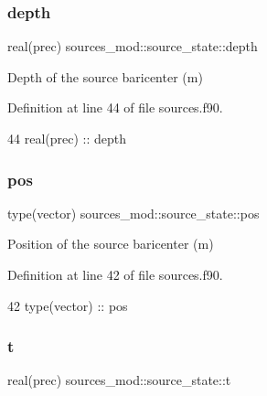 \subsubsection{\texorpdfstring{depth}{depth}}
{\footnotesize\ttfamily real(prec) sources\+\_\+mod\+::source\+\_\+state\+::depth\hspace{0.3cm}{\ttfamily [private]}}



Depth of the source baricenter (m) 



Definition at line 44 of file sources.\+f90.


\begin{DoxyCode}
44         \textcolor{keywordtype}{real(prec)} :: depth
\end{DoxyCode}
\mbox{\label{structsources__mod_1_1source__state_a8dacf7040158bb5214f66476bf1a1c3d}} 
\subsubsection{\texorpdfstring{pos}{pos}}
{\footnotesize\ttfamily type(vector) sources\+\_\+mod\+::source\+\_\+state\+::pos\hspace{0.3cm}{\ttfamily [private]}}



Position of the source baricenter (m) 



Definition at line 42 of file sources.\+f90.


\begin{DoxyCode}
42         \textcolor{keywordtype}{type}(vector) :: pos
\end{DoxyCode}
\mbox{\label{structsources__mod_1_1source__state_a7d51970a13f9664bbaf9d09afea0b363}} 
\subsubsection{\texorpdfstring{t}{t}}
{\footnotesize\ttfamily real(prec) sources\+\_\+mod\+::source\+\_\+state\+::t\hspace{0.3cm}{\ttfamily [private]}}



